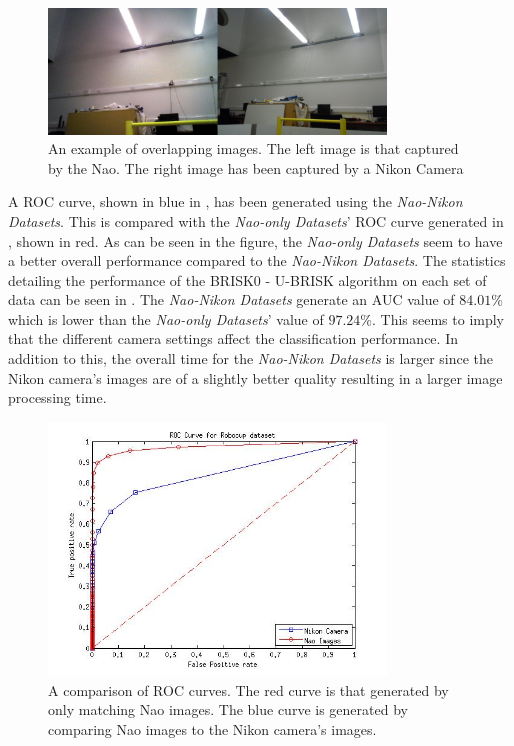 \documentclass[11pt]{report}
\begin{document}
\begin{figure}[h!] 
  \centering
    \includegraphics[width=0.8\textwidth]{../Drawings/camera/compareRobocup.jpg}
    \caption{An example of overlapping images. The left image is that captured by the Nao. The right image has been captured by a Nikon Camera}
    \label{fig:cameraOverlapRobocup}
\end{figure}

A ROC curve, shown in blue in , has been generated using the \textit{Nao-Nikon Datasets}.  This is compared with the \textit{Nao-only Datasets}' ROC curve generated in , shown in red. As can be seen in the figure, the \textit{Nao-only Datasets} seem to have a better overall performance compared to the \textit{Nao-Nikon Datasets}. The statistics detailing the performance of the BRISK0 - U-BRISK algorithm on each set of data can be seen in . The \textit{Nao-Nikon Datasets} generate an AUC value of $84.01\%$ which is lower than the \textit{Nao-only Datasets}' value of $97.24\%$. This seems to imply that the different camera settings affect the classification performance. In addition to this, the overall time for the \textit{Nao-Nikon Datasets} is larger since the Nikon camera's images are of a slightly better quality resulting in a larger image processing time. \\

\begin{figure}[h!] 
  \centering
    \includegraphics[width=0.8\textwidth]{../Drawings/camera/ROC_Robocup.jpg}
    \caption{A comparison of ROC curves. The red curve is that generated by only matching Nao images. The blue curve is generated by comparing Nao images to the Nikon camera's images. }
    \label{fig:rocRobocupNikon}
\end{figure}
\end{document}
